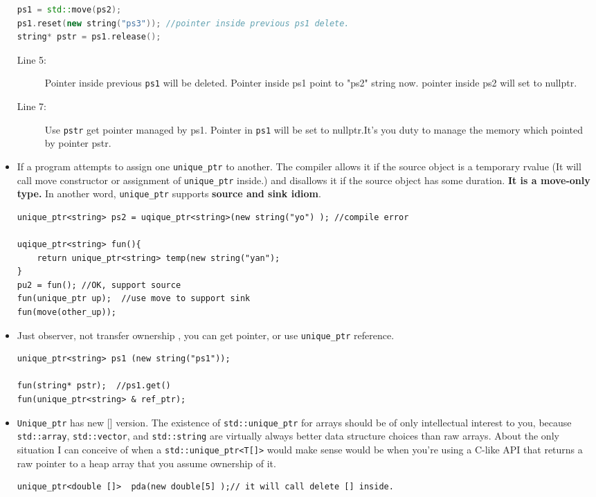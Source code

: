 \documentclass[a4paper,11pt,twoside]{book}
\begin{document}
\begin{itemize}
\begin{lstlisting}[frame=single, language=c++]
ps1 = std::move(ps2); 
ps1.reset(new string("ps3")); //pointer inside previous ps1 delete. 
string* pstr = ps1.release(); 
\end{lstlisting}
\begin{description}
	\item[Line 5:]  Pointer inside previous \texttt{ps1} will be deleted. Pointer inside ps1 point to "ps2" string now. pointer inside ps2 will set to nullptr.
	
	\item[Line 7:] Use \texttt{pstr} get pointer managed by ps1. Pointer in \texttt{ps1} will be set to nullptr.It's you duty to manage the memory which pointed by pointer pstr.
\end{description} 

\item If a program attempts to assign one \texttt{unique\_ptr} to another. The compiler allows it if the source object is a temporary rvalue (It will call move constructor or assignment of \texttt{unique\_ptr} inside.) and disallows it if the source object has some duration. \textbf{It is a move-only type.} In another word, \texttt{unique\_ptr} supports \textbf{source and sink idiom}.
\begin{lstlisting}[numbers=none]
unique_ptr<string> ps2 = uqique_ptr<string>(new string("yo") ); //compile error

uqique_ptr<string> fun(){
	return unique_ptr<string> temp(new string("yan");
}
pu2 = fun(); //OK, support source
fun(unique_ptr up);  //use move to support sink
fun(move(other_up));
\end{lstlisting}


\item Just observer, not transfer ownership , you can get pointer, or use \texttt{unique\_ptr} reference.
\begin{lstlisting}[numbers=none]
unique_ptr<string> ps1 (new string("ps1"));

fun(string* pstr);  //ps1.get()
fun(unique_ptr<string> & ref_ptr);
\end{lstlisting}


\item \texttt{Unique\_ptr} has new [] version. The existence of \texttt{std::unique\_ptr} for arrays should be of only intellectual interest to you, because \texttt{std::array}, \texttt{std::vector}, and \texttt{std::string} are virtually always better data structure choices than raw arrays. About the only situation I can conceive of when a \texttt{std::unique\_ptr<T[]>} would make sense would be when you're using a C-like API that returns a raw pointer to a heap array that you assume ownership of it.
\begin{lstlisting}[numbers=none]
unique_ptr<double []>  pda(new double[5] );// it will call delete [] inside.
\end{lstlisting}



\end{itemize}
\end{document}
